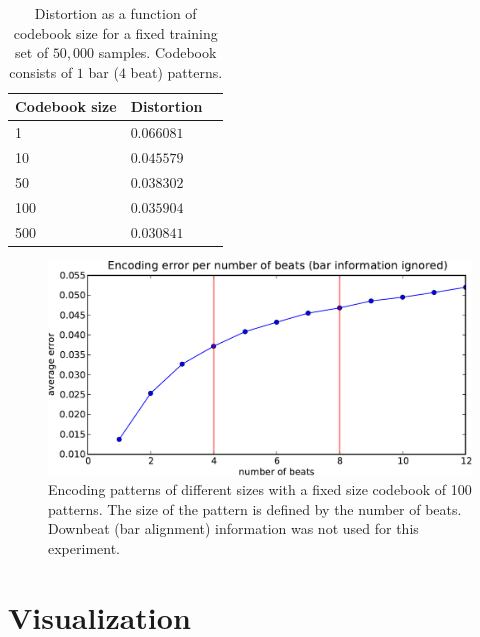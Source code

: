 \documentclass{article}
\begin{document}
\begin{table}
\begin{center}
\begin{tabular}{llc}
\toprule
Codebook size & Distortion \\
\midrule
1 & $0.066081$ \\
10 & $0.045579$ \\
50 & $0.038302$ \\
100 & $0.035904$ \\
500 & $0.030841$ \\
\bottomrule
\end{tabular}
\end{center}
\caption{\small{Distortion as a function of codebook size for a fixed training set 
of $50,000$ samples.  Codebook consists of $1$ bar ($4$ beat) patterns.
  }}
\label{tab:cbsize}
\end{table}


\begin{figure}[t]
\begin{center}
\includegraphics[width=.8\columnwidth]{encoding_per_beat}
\end{center}
\caption{\small{Encoding patterns of different sizes with a fixed size
codebook of 100 patterns. The size of the pattern is defined by the number of beats. 
Downbeat (bar alignment) information was not used for this experiment. %
}}
\label{fig:perbeat}
\end{figure}


\section{Visualization} \label{sec:visu}
\end{document}
